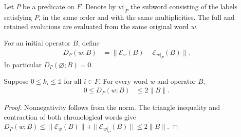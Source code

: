 Let $P$ be a predicate on $F$. Denote by $w|_P$ the subword
consisting of the labels satisfying $P$, in the same order and
with the same multiplicities. The full and retained evolutions
are evaluated from the same original word $w$.

\begin{definition}
    \label{def:al_channel_word_omission_defect}
    \leanok
    For an initial operator $B$, define
    \begin{align}
        \label{eq:al_omission_defect}
        D_P(w;B) & =\|\mathcal E_w(B)-\mathcal E_{w|_P}(B)\|.
    \end{align}
    In particular $D_P(\varnothing;B)=0$.
\end{definition}

\begin{theorem}
    \label{thm:al_channel_word_omission_bounds}
    \leanok
    Suppose $0\le k_i\le\mathbb 1$ for all $i\in F$.
    For every word $w$ and operator $B$,
    \begin{align}
        \label{eq:al_omission_uniform_bound}
        0\le D_P(w;B) & \le 2\|B\|.
    \end{align}
\end{theorem}
\begin{proof}
    \leanok
    Nonnegativity follows from the norm. The triangle inequality
    and contraction of both chronological words give
    $D_P(w;B)\le\|\mathcal E_w(B)\|+
        \|\mathcal E_{w|_P}(B)\|\le2\|B\|$.
\end{proof}

